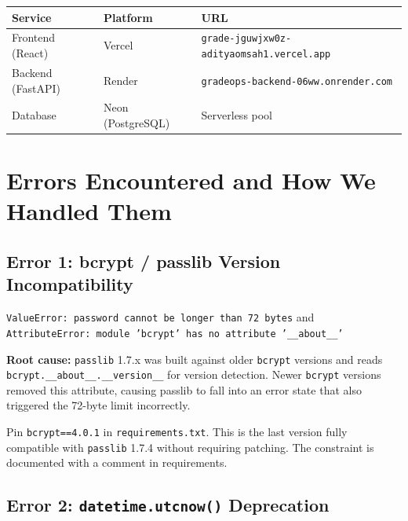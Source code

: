 \documentclass[12pt,a4paper]{article}
\begin{document}
\begin{center}
\begin{tabular}{lll}
\toprule
\textbf{Service} & \textbf{Platform} & \textbf{URL} \\
\midrule
Frontend (React) & Vercel & \texttt{grade-jguwjxw0z-adityaomsah1.vercel.app} \\
Backend (FastAPI) & Render & \texttt{gradeops-backend-06ww.onrender.com} \\
Database & Neon (PostgreSQL) & Serverless pool \\
\bottomrule
\end{tabular}
\end{center}

\section{Errors Encountered and How We Handled Them}

\subsection{Error 1: bcrypt / passlib Version Incompatibility}

\begin{errorbox}[Error]
\texttt{ValueError: password cannot be longer than 72 bytes} and \texttt{AttributeError: module 'bcrypt' has no attribute '\_\_about\_\_'}
\end{errorbox}

\textbf{Root cause:} \texttt{passlib} 1.7.x was built against older \texttt{bcrypt} versions and reads \texttt{bcrypt.\_\_about\_\_.\_\_version\_\_} for version detection. Newer \texttt{bcrypt} versions removed this attribute, causing passlib to fall into an error state that also triggered the 72-byte limit incorrectly.

\begin{successbox}[Fix]
Pin \texttt{bcrypt==4.0.1} in \texttt{requirements.txt}. This is the last version fully compatible with \texttt{passlib} 1.7.4 without requiring patching. The constraint is documented with a comment in requirements.
\end{successbox}

\subsection{Error 2: \texttt{datetime.utcnow()} Deprecation}
\end{document}
